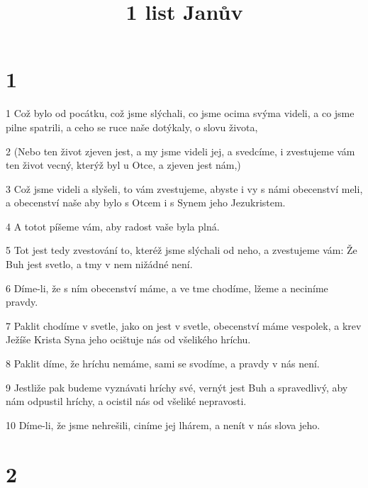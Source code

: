 

\title{1 list Janův}

\chapter{1}

\par 1 Což bylo od pocátku, což jsme slýchali, co jsme ocima svýma videli, a co jsme pilne spatrili, a ceho se ruce naše dotýkaly, o slovu života,
\par 2 (Nebo ten život zjeven jest, a my jsme videli jej, a svedcíme, i zvestujeme vám ten život vecný, kterýž byl u Otce, a zjeven jest nám,)
\par 3 Což jsme videli a slyšeli, to vám zvestujeme, abyste i vy s námi obecenství meli, a obecenství naše aby bylo s Otcem i s Synem jeho Jezukristem.
\par 4 A totot píšeme vám, aby radost vaše byla plná.
\par 5 Tot jest tedy zvestování to, kteréž jsme slýchali od neho, a zvestujeme vám: Že Buh jest svetlo, a tmy v nem nižádné není.
\par 6 Díme-li, že s ním obecenství máme, a ve tme chodíme, lžeme a neciníme pravdy.
\par 7 Paklit chodíme v svetle, jako on jest v svetle, obecenství máme vespolek, a krev Ježíše Krista Syna jeho ocištuje nás od všelikého hríchu.
\par 8 Paklit díme, že hríchu nemáme, sami se svodíme, a pravdy v nás není.
\par 9 Jestliže pak budeme vyznávati hríchy své, vernýt jest Buh a spravedlivý, aby nám odpustil hríchy, a ocistil nás od všeliké nepravosti.
\par 10 Díme-li, že jsme nehrešili, ciníme jej lhárem, a nenít v nás slova jeho.

\chapter{2}

